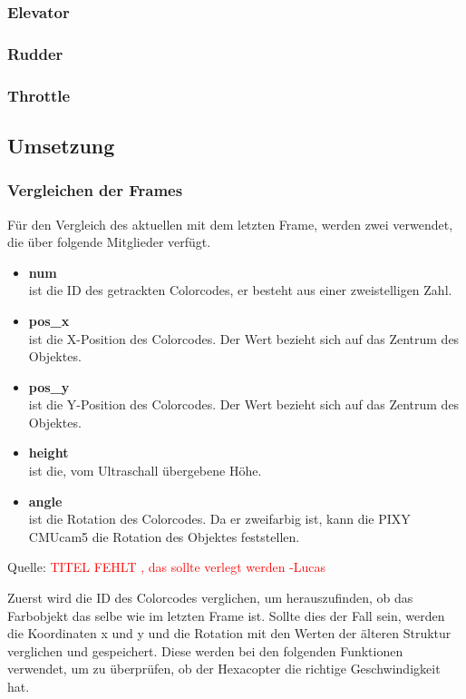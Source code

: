     \subsubsection{Elevator}
    \subsubsection{Rudder}


    \subsubsection{Throttle}

  \subsection{Umsetzung}

    \subsubsection{Vergleichen der Frames}
    Für den Vergleich des aktuellen mit dem letzten Frame, werden zwei  verwendet, die über folgende Mitglieder verfügt.
    \begin{itemize}
      \item \textbf{num}\\
      ist die ID des getrackten Colorcodes, er besteht aus einer zweistelligen Zahl.
      \item \textbf{pos\_x}\\
      ist die X-Position des Colorcodes. Der Wert bezieht sich auf das Zentrum des Objektes.
      \item \textbf{pos\_y}\\
      ist die Y-Position des Colorcodes. Der Wert bezieht sich auf das Zentrum des Objektes.
      \item \textbf{height}\\
      ist die, vom Ultraschall übergebene Höhe.
      \item \textbf{angle}\\
      ist die Rotation des Colorcodes. Da er zweifarbig ist, kann die PIXY CMUcam5 die Rotation des Objektes feststellen.
    \end{itemize}

    Quelle: \textcolor{red}{TITEL FEHLT \cite{Structs}, das sollte verlegt werden -Lucas}

    Zuerst wird die ID des Colorcodes verglichen, um herauszufinden, ob das Farbobjekt das selbe wie im letzten Frame ist.
    Sollte dies der Fall sein, werden die Koordinaten x und y und die Rotation mit den Werten der älteren Struktur verglichen und gespeichert.
    Diese werden bei den folgenden Funktionen verwendet, um zu überprüfen, ob der Hexacopter die richtige Geschwindigkeit hat.

